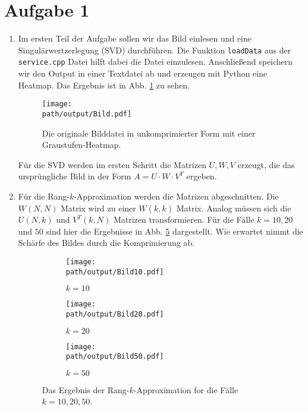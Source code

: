\section*{Aufgabe 1}

\begin{enumerate}[label=\alph*)]

\item Im ersten Teil der Aufgabe sollen wir das Bild einlesen und eine Singulärwertzerlegung (SVD) durchführen.
Die Funktion \texttt{loadData} aus der \texttt{service.cpp} Datei hilft dabei die Datei einzulesen. Anschließend speichern wir den Output in einer Textdatei ab und erzeugen mit Python eine Heatmap. Das Ergebnis ist in Abb. \ref{fig:data} zu sehen.

\begin{figure}
    \centering
    \texttt{[image: \\path/output/Bild.pdf]}
    \caption{Die originale Bilddatei in unkomprimierter Form mit einer Graustufen-Heatmap.}
    \label{fig:data}
\end{figure}

Für die SVD werden im ersten Schritt die Matrizen $U, W, V$ erzeugt, die das ursprüngliche Bild in der Form $A = U \cdot W \cdot V^T$ ergeben.

\item Für die Rang-$k$-Approximation werden die Matrizen abgeschnitten. Die $W(N,N)$ Matrix wird zu einer $W(k,k)$ Matrix. Analog müssen sich die $U(N,k)$ und $V^T(k, N)$ Matrizen transformieren.
Für die Fälle $k = 10, 20$ und $50$ sind hier die Ergebnisse in Abb. \ref{fig:approx} dargestellt. Wie erwartet nimmt die Schärfe des Bildes durch die Komprimierung ab.

\begin{figure}
    \centering
\begin{subfigure}[b]{0.3\textwidth}
    \texttt{[image: \\path/output/Bild10.pdf]}
    \caption{$k = 10$}
    \label{fig:data10}
\end{subfigure}
\hfill
\begin{subfigure}[b]{0.3\textwidth}
    \texttt{[image: \\path/output/Bild20.pdf]}
    \caption{$k = 20$}
    \label{fig:data20}
\end{subfigure}
\hfill
\begin{subfigure}[b]{0.3\textwidth}
    \texttt{[image: \\path/output/Bild50.pdf]}
    \caption{$k = 50$}
    \label{fig:data50}
\end{subfigure}
\caption{Das Ergebnis der Rang-$k$-Approximation for die Fälle $k = 10,20,50$.}
\label{fig:approx}
\end{figure}

\end{enumerate}

